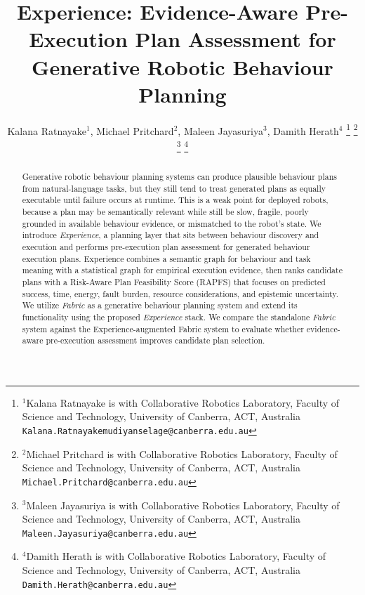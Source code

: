 \documentclass[letterpaper, 10pt, conference]{ieeeconf}
\begin{document}
\title{Experience: Evidence-Aware Pre-Execution Plan Assessment for Generative Robotic Behaviour Planning}

\author{Kalana Ratnayake$^{1}$, Michael Pritchard$^{2}$, Maleen Jayasuriya$^{3}$, Damith Herath$^{4}$%
\thanks{$^{1}$Kalana Ratnayake is with Collaborative Robotics Laboratory, Faculty of Science and Technology, University of Canberra, ACT, Australia {\tt\small Kalana.Ratnayakemudiyanselage@canberra.edu.au}}%
\thanks{$^{2}$Michael Pritchard is with Collaborative Robotics Laboratory, Faculty of Science and Technology, University of Canberra, ACT, Australia {\tt\small Michael.Pritchard@canberra.edu.au}}%
\thanks{$^{3}$Maleen Jayasuriya is with Collaborative Robotics Laboratory, Faculty of Science and Technology, University of Canberra, ACT, Australia {\tt\small Maleen.Jayasuriya@canberra.edu.au}}%
\thanks{$^{4}$Damith Herath is with Collaborative Robotics Laboratory, Faculty of Science and Technology, University of Canberra, ACT, Australia {\tt\small Damith.Herath@canberra.edu.au}}%
}

\maketitle

\begin{abstract}
Generative robotic behaviour planning systems can produce plausible behaviour plans from natural-language tasks, but they still tend to treat generated plans as equally executable until failure occurs at runtime. This is a weak point for deployed robots, because a plan may be semantically relevant while still be slow, fragile, poorly grounded in available behaviour evidence, or mismatched to the robot's state. We introduce \textit{Experience}, a planning layer that sits between behaviour discovery and execution and performs pre-execution plan assessment for generated behaviour execution plans. Experience combines a semantic graph for behaviour and task meaning with a statistical graph for empirical execution evidence, then ranks candidate plans with a Risk-Aware Plan Feasibility Score (RAPFS) that focuses on predicted success, time, energy, fault burden, resource considerations, and epistemic uncertainty. We utilize \textit{Fabric} as a generative behaviour planning system and extend its functionality using the proposed \textit{Experience} stack. We compare the standalone \textit{Fabric} system against the Experience-augmented Fabric system to evaluate whether evidence-aware pre-execution assessment improves candidate plan selection.
\end{abstract}
\end{document}
